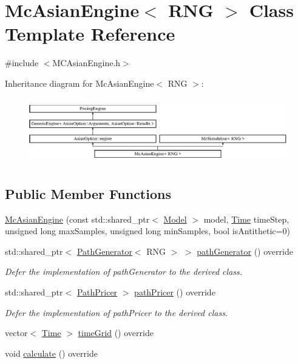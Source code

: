 \hypertarget{class_mc_asian_engine}{}\section{Mc\+Asian\+Engine$<$ R\+NG $>$ Class Template Reference}
\label{class_mc_asian_engine}


{\ttfamily \#include $<$M\+C\+Asian\+Engine.\+h$>$}

Inheritance diagram for Mc\+Asian\+Engine$<$ R\+NG $>$\+:\begin{figure}[H]
\begin{center}
\leavevmode
\includegraphics[height=2.894057cm]{class_mc_asian_engine}
\end{center}
\end{figure}
\subsection*{Public Member Functions}
\begin{DoxyCompactItemize}
\item 
\hyperlink{class_mc_asian_engine_a4b2cd236024fd32623e1f7a7a27277d6}{Mc\+Asian\+Engine} (const std\+::shared\+\_\+ptr$<$ \hyperlink{class_model}{Model} $>$ model, \hyperlink{_name_def_8h_ac2d3e0ba793497bcca555c7c2cf64ff3}{Time} time\+Step, unsigned long max\+Samples, unsigned long min\+Samples, bool is\+Antithetic=0)
\item 
std\+::shared\+\_\+ptr$<$ \hyperlink{class_path_generator}{Path\+Generator}$<$ R\+NG $>$ $>$ \hyperlink{class_mc_asian_engine_ae38592c71ae4d5d09c9eb13d7cc0c5ff}{path\+Generator} () override
\begin{DoxyCompactList}\small\item\em Defer the implementation of path\+Generator to the derived class. \end{DoxyCompactList}\item 
std\+::shared\+\_\+ptr$<$ \hyperlink{class_path_pricer}{Path\+Pricer} $>$ \hyperlink{class_mc_asian_engine_a5b7351c28b68878b7f6d130eef293d6c}{path\+Pricer} () override
\begin{DoxyCompactList}\small\item\em Defer the implementation of path\+Pricer to the derived class. \end{DoxyCompactList}\item 
vector$<$ \hyperlink{_name_def_8h_ac2d3e0ba793497bcca555c7c2cf64ff3}{Time} $>$ \hyperlink{class_mc_asian_engine_ad8d2c8721172ab1d7327db91a26c5052}{time\+Grid} () override
\item 
void \hyperlink{class_mc_asian_engine_ac16f4259846f55dc6c02d0b628f34e63}{calculate} () override
\end{DoxyCompactItemize}
